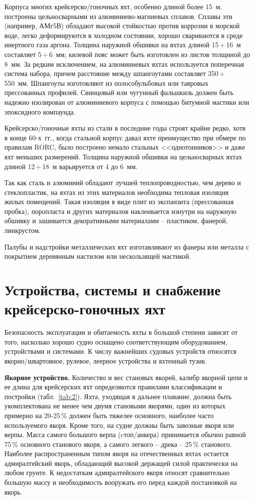 \documentclass[a4paper, 12pt, twoside, final, book, russian, fittopage, cyremdash]{ncc}
\newcommand{\otdo}{\,\ensuremath{\div}\,}
\begin{document}
Корпуса многих крейсерско\-/гоночных яхт, особенно длиной более 15~м, построены цельносварными из алюминиево-магниевых сплавов. Сплавы эти (например, АМг5В) обладают высокой стойкостью против коррозии в морской воде, легко деформируются в холодном состоянии, хорошо свариваются в среде инертного газа аргона. Толщина наружной обшивки на яхтах длиной 15\otdo 16~м составляет 5\otdo 6~мм; килевой пояс может быть изготовлен из листов толщиной до 8~мм. За редким исключением, на алюминиевых яхтах используется поперечная система набора, причем расстояние между шпангоутами составляет 350\otdo 550~мм. Шпангоуты изготовляют из полособульбовых или тавровых прессованных профилей. Свинцовый или чугунный фальшкиль должен быть надежно изолирован от алюминиевого корпуса с помощью битумной мастики или эпоксидного компаунда.

Крейсерско\-/гоночные яхты из стали в последние годы строят крайне редко, хотя в конце 60-х~гг., когда стальной корпус давал яхте преимущество при обмере по правилам RORC, было построено немало стальных <<однотонников>> и даже яхт меньших размерений. Толщина наружной обшивки на цельносварных яхтах длиной 12\otdo 18~м варьируется от 4 до 6~мм.

Так как сталь и алюминий обладают лучшей теплопроводностью, чем дерево и стеклопластик, на яхтах из этих материалов необходима тепловая изоляция жилых помещений. Такая изоляция в виде плит из экспанзита (прессованная пробка), поропласта и других материалов наклеивается изнутри на наружную обшивку и зашивается декоративными материалами \--- пластиком, фанерой, линкрустом.

Палубы и надстройки металлических яхт изготавливают из фанеры или металла с покрытием деревянным настилом или нескользящей мастикой. 

\section{Устройства, системы и снабжение крейсерско-гоночных яхт}

Безопасность эксплуатации и обитаемость яхты в большой степени зависят от того, насколько хорошо судно оснащено соответствующим оборудованием, устройствами и системами. К числу важнейших судовых устройств относятся якорно\-/швартовное, рулевое, леерное устройства и яхтенный тузик.

\textbf{Якорное устройство.} Количество и вес становых якорей, калибр якорной цепи и ее длина для крейсерских яхт определяются правилами классификации и постройки (табл.~\ref{tab:2}). Яхта, уходящая в дальнее плавание, должна быть укомплектована не менее чем двумя становыми якорями, один из которых примерно на 20-25\,\% должен быть тяжелее основного, наиболее часто используемого якоря. Кроме того, на судне должны быть завозные якоря или верпы. Масса самого большого верпа (cтоп\-/анкера) принимается обычно равной 75\,\% основного станового якоря, а самого легкого \--- дрека \--- 25\,\% станового.
Наиболее распространенным типом якоря на отечественных яхтах остается адмиралтейский якорь, обладающий высокой держащей силой практически на любом грунте. К недостаткам адмиралтейского якоря относят сравнительно большую массу и необходимость вооружать его перед каждой постановкой на якорь. 
\end{document}

